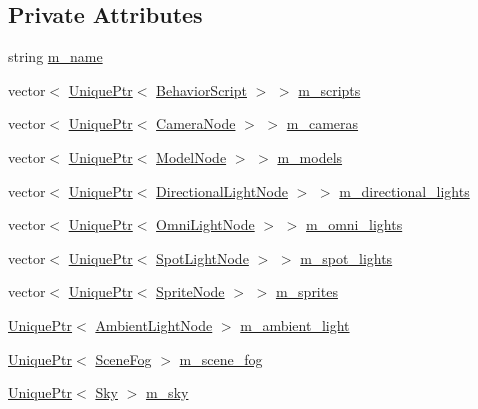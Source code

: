 \subsection*{Private Attributes}
\begin{DoxyCompactItemize}
\item 
string \hyperlink{classmage_1_1_scene_a6cc8cb08b1853c4e3063b33a94e8fb47}{m\+\_\+name}
\item 
vector$<$ \hyperlink{namespacemage_a3316d7143a973e37adf1110f2e80ca31}{Unique\+Ptr}$<$ \hyperlink{classmage_1_1_behavior_script}{Behavior\+Script} $>$ $>$ \hyperlink{classmage_1_1_scene_abdda0e08ff976b6697ef8fcc0a53f72e}{m\+\_\+scripts}
\item 
vector$<$ \hyperlink{namespacemage_a3316d7143a973e37adf1110f2e80ca31}{Unique\+Ptr}$<$ \hyperlink{classmage_1_1_camera_node}{Camera\+Node} $>$ $>$ \hyperlink{classmage_1_1_scene_a52cb8cd511304854e43c37fc0148bfea}{m\+\_\+cameras}
\item 
vector$<$ \hyperlink{namespacemage_a3316d7143a973e37adf1110f2e80ca31}{Unique\+Ptr}$<$ \hyperlink{classmage_1_1_model_node}{Model\+Node} $>$ $>$ \hyperlink{classmage_1_1_scene_a84e7606151e92bffe591e5303e0b7d5e}{m\+\_\+models}
\item 
vector$<$ \hyperlink{namespacemage_a3316d7143a973e37adf1110f2e80ca31}{Unique\+Ptr}$<$ \hyperlink{namespacemage_a7637b5351fc0f66a10badd80ebb35899}{Directional\+Light\+Node} $>$ $>$ \hyperlink{classmage_1_1_scene_a4546b3403a04ca8dcf116368a8bce001}{m\+\_\+directional\+\_\+lights}
\item 
vector$<$ \hyperlink{namespacemage_a3316d7143a973e37adf1110f2e80ca31}{Unique\+Ptr}$<$ \hyperlink{namespacemage_a1724c6e6b6b5ba535cdd967cbbb4a669}{Omni\+Light\+Node} $>$ $>$ \hyperlink{classmage_1_1_scene_a308f40aa62dbfc519ab9c9c2a123a62c}{m\+\_\+omni\+\_\+lights}
\item 
vector$<$ \hyperlink{namespacemage_a3316d7143a973e37adf1110f2e80ca31}{Unique\+Ptr}$<$ \hyperlink{namespacemage_aeed5dee4ff6c591eabb0e9114256df4a}{Spot\+Light\+Node} $>$ $>$ \hyperlink{classmage_1_1_scene_a52b564785e08b5945fcefc40d7bdbad6}{m\+\_\+spot\+\_\+lights}
\item 
vector$<$ \hyperlink{namespacemage_a3316d7143a973e37adf1110f2e80ca31}{Unique\+Ptr}$<$ \hyperlink{classmage_1_1_sprite_node}{Sprite\+Node} $>$ $>$ \hyperlink{classmage_1_1_scene_aab1c5a9895db0ba1df7bb00749962583}{m\+\_\+sprites}
\item 
\hyperlink{namespacemage_a3316d7143a973e37adf1110f2e80ca31}{Unique\+Ptr}$<$ \hyperlink{namespacemage_ab0783a7428706251f8561dc30a4d228d}{Ambient\+Light\+Node} $>$ \hyperlink{classmage_1_1_scene_a16cc4fd9d0299eb816b1c955ee7739b3}{m\+\_\+ambient\+\_\+light}
\item 
\hyperlink{namespacemage_a3316d7143a973e37adf1110f2e80ca31}{Unique\+Ptr}$<$ \hyperlink{classmage_1_1_scene_fog}{Scene\+Fog} $>$ \hyperlink{classmage_1_1_scene_a58f8d29322664c4c5895703a6cbc9000}{m\+\_\+scene\+\_\+fog}
\item 
\hyperlink{namespacemage_a3316d7143a973e37adf1110f2e80ca31}{Unique\+Ptr}$<$ \hyperlink{classmage_1_1_sky}{Sky} $>$ \hyperlink{classmage_1_1_scene_a90163a34ed39216b14175c4b799abd46}{m\+\_\+sky}
\end{DoxyCompactItemize}


